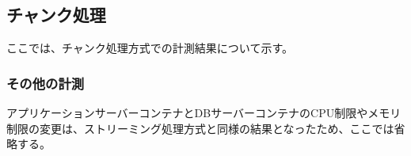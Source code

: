 \documentclass[../../../main]{subfiles}
\begin{document}
    \subsection{チャンク処理}\label{subsec:result-chunk}

    ここでは、チャンク処理方式での計測結果について示す。

    

    \subsubsection{その他の計測}

    アプリケーションサーバーコンテナとDBサーバーコンテナのCPU制限やメモリ制限の変更は、ストリーミング処理方式と同様の結果となったため、ここでは省略する。
\end{document}
